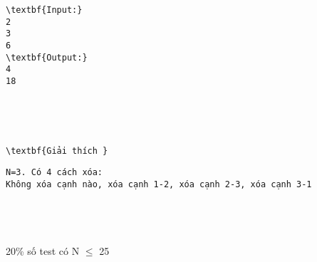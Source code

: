 \begin{verbatim}
\textbf{Input:}
2
3
6
\textbf{Output:}  
4
18\end{verbatim}

 

 
\begin{verbatim}
\textbf{Giải thích }\end{verbatim}
\begin{verbatim}
N=3. Có 4 cách xóa:
Không xóa cạnh nào, xóa cạnh 1-2, xóa cạnh 2-3, xóa cạnh 3-1 \end{verbatim}
\begin{verbatim}
 \end{verbatim}
\begin{verbatim}
 \end{verbatim}
20\% số test có N  $\le$  25  